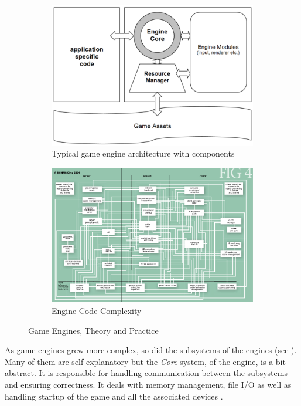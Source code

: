 \begin{figure}[H]
    \begin{subfigure}[b]{\textwidth}
        \includegraphics[width=\textwidth]{images/Game-development/Typical-game-engine.png}
        \caption{Typical game engine architecture with components \cite{5962102}}
        \label{fig:typical-architecture}
    \end{subfigure}
    \begin{subfigure}[b]{\textwidth}
        \includegraphics[width=\textwidth]{images/blow-complexity.png}
        \caption{Engine Code Complexity \cite{blow2004game}}
        \label{fig:engine-compl}
    \end{subfigure}
    \caption{Game Engines, Theory and Practice}
    \label{fig:engine-theo-prac}
\end{figure}

As game engines grew more complex, so did the subsystems of the engines \cite{blow2004game} (see ). Many of them are self-explanatory but the \textit{Core} system, of the engine, is a bit abstract. It is responsible for handling communication between the subsystems and ensuring correctness. It deals with memory management, file \ac{I/O} as well as handling startup of the game and all the associated devices \cite{nilson2007game}. 

